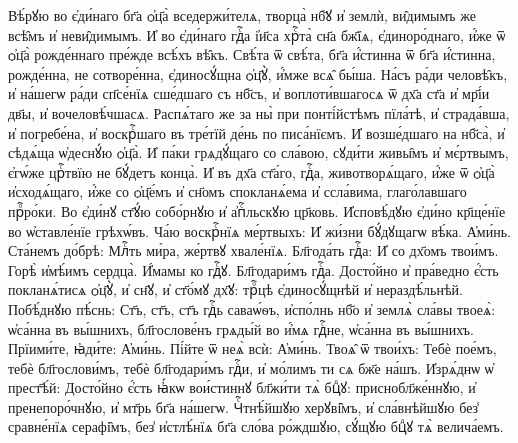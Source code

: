 \cuLettrine
Вѣ́рꙋю во є҆ди́наго бг҃а ѻ҆ц҃а̀ вседержи́телѧ, творца̀  нб҃ꙋ и҆ землѝ, ви̑димымъ же всѣ̑мъ и҆ неви̑димымъ. И҆ во  є҆ди́наго гдⷭ҇а і҆и҃са хрⷭ҇та̀ сн҃а бж҃їѧ, є҆диноро́днаго,  и҆́же ѿ ѻ҆ц҃а̀ рожде́ннаго пре́жде всѣ́хъ вѣ̑къ.  Свѣ́та ѿ свѣ́та, бг҃а и҆́стинна ѿ бг҃а и҆́стинна,  рожде́нна, не сотворе́нна, є҆диносꙋ́щна ѻ҆ц҃ꙋ̀, и҆́мже  всѧ̑ бы́ша. На́съ ра́ди человѣ̑къ, и҆ на́шегѡ ра́ди  сп҃се́нїѧ сше́дшаго съ нб҃съ, и҆ воплоти́вшагосѧ ѿ дх҃а  ст҃а и҆ мр҃і́и дв҃ы, и҆ вочеловѣ́чшасѧ. Распѧ́таго же за  ны̀ при понті́йстѣмъ пїла́тѣ, и҆ страда́вша, и҆  погребе́на, и҆ воскрⷭ҇шаго въ тре́тїй де́нь по писа́нїємъ.  И҆ возше́дшаго на нб҃са̀, и҆ сѣдѧ́ща ѡ҆деснꙋ́ю ѻ҆ц҃а̀. И҆  па́ки грѧдꙋ́щаго со сла́вою, сꙋди́ти живы̑мъ и҆ мє́ртвымъ,  є҆гѡ́же црⷭ҇твїю не бꙋ́детъ конца̀. 
\hKv И҆ въ дх҃а ст҃а́го,  гдⷭ҇а, животворѧ́щаго, и҆́же ѿ ѻ҆ц҃а̀ и҆сходѧ́щаго, и҆́же  со ѻ҆ц҃е́мъ и҆ сн҃омъ спокланѧ́ема и҆ ссла́вима,  глаго́лавшаго прⷪ҇ро́ки. 
Во є҆ди́нꙋ  ст҃ꙋ́ю собо́рнꙋю и҆ а҆пⷭ҇льскꙋю цр҃ковь. 
И҆сповѣ́дꙋю  є҆ди́но кр҃ще́нїе во ѡ҆ставле́нїе грѣхѡ́въ. Ча́ю  воскрⷭ҇нїѧ ме́ртвыхъ: И҆ жи́зни бꙋ́дꙋщагѡ вѣ́ка. А҆ми́нь. 
%
 Ста́немъ до́брѣ:  Млⷭ҇ть ми́ра, же́ртвꙋ  хвале́нїѧ. 
 Бл҃года́ть гдⷭ҇а:  И҆ со  дх҃омъ твои́мъ. 
 Горѣ̀ и҆мѣ́имъ сердца̀.  И҆́мамы ко гдⷭ҇ꙋ. 
 Бл҃годари́мъ гдⷭ҇а.  
 Досто́йно и҆ пра́ведно є҆́сть покланѧ́тисѧ ѻ҆ц҃ꙋ̀,  и҆ сн҃ꙋ, и҆ ст҃о́мꙋ дх҃ꙋ: трⷪ҇цѣ є҆диносꙋ́щнѣй и҆  нераздѣ́льнѣй. 
  Побѣ́днꙋю пѣ́снь: 
   Ст҃ъ, ст҃ъ, ст҃ъ гдⷭ҇ь саваѡ́ѳъ, и҆спо́лнь нб҃о и҆ землѧ̀  сла́вы твоеѧ̀: ѡ҆са́нна въ вы́шнихъ, бл҃гослове́нъ грѧды́й  
     во и҆́мѧ гдⷭ҇не, ѡ҆са́нна въ вы́шнихъ. 
  Прїими́те, ꙗ҆ди́те:  А҆ми́нь. 
 Пі́йте ѿ  неѧ̀ всѝ:  А҆ми́нь. 
 Твоѧ̑ ѿ твои́хъ:   Тебѐ пое́мъ, тебѐ бл҃гослови́мъ, тебѐ  бл҃годари́мъ гдⷭ҇и, и҆ мо́лимъ ти сѧ бж҃е на́шъ. 
 И҆зрѧ́днѡ ѡ҆ прест҃ѣ́й:   Досто́йно є҆́сть ꙗ҆́кѡ вои́стиннꙋ бл҃жи́ти тѧ̀  бцⷣꙋ: приснобл҃же́ннꙋю, и҆ пренепоро́чнꙋю, и҆ мт҃рь бг҃а на́шегѡ. 
Чⷭ҇тнѣ́йшꙋю херꙋві̑мъ, и҆ сла́внѣйшꙋю без̾  сравне́нїѧ серафі̑мъ, без̾ и҆стлѣ́нїѧ бг҃а сло́ва  ро́ждшꙋю, сꙋ́щꙋю бцⷣꙋ тѧ̀ велича́емъ. 


